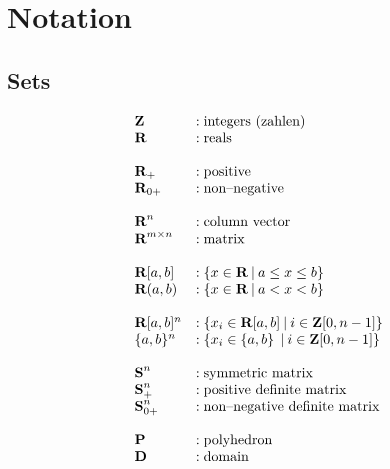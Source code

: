 \documentclass{article}
\title{\QP}
\author {
            Dr. Luke A.~Wendt                                       \\
            Department of Electrical and Computer Engineering       \\
            University of Illinois at Urbana-Champaign              \\
            \texttt{Luke.A.Wendt@gmail.com}                         \\
            \url{Luke-A-Wendt.info}                                 \\
        }
\begin{document}
\maketitle
\begin{abstract}

    This repo explores general formulation 
    of \LP (linear programs)  and \QP (quadratic programs)
    with applications in modeling, prediction, and control.
    These formulations have well-known solution methods that scale and 
    are fully developed technologies integrated into most programming languages
    (making them readily available for embedded applications).
    State-of-the-art implamentation uses hardware accelerated 
    distributed optimization specialized for sparse representations and parallelization.


\end{abstract}
\clearpage
\tableofcontents
\clearpage
\section{Notation}

\subsection{Sets}
\begin{align*}
    \begin{array}{ll}
        \textbf{Z}&:\text{integers (zahlen)}\\
        \textbf{R}&:\text{reals}\\
        \\
        \textbf{R}_+&: \text{positive}\\
        \textbf{R}_{0+}&: \text{non--negative}\\
        \\
        \textbf{R}^n &:\text{column vector}\\
        \textbf{R}^{m\times n} &:\text{matrix}\\
        \\
        \textbf{R}[a,b] &:\{x\in\textbf{R}\:|\:a\leq x\leq b\}\\
        \textbf{R}(a,b) &:\{x\in\textbf{R}\:|\:a<x<b\}\\
        \\
        \textbf{R}[a,b]^n&: \{x_i\in\textbf{R}[a,b]\:|\:i\in\textbf{Z}[0,n-1]\}\\
        \{a,b\}^n&: \{x_i\in\{a,b\}\:\:|\:i\in\textbf{Z}[0,n-1]\}\\
        \\
        \textbf{S}^n&: \text{symmetric matrix}\\
        \textbf{S}_+^n&: \text{positive definite matrix}\\
        \textbf{S}_{0+}^n&: \text{non--negative definite matrix}\\
        \\
        \textbf{P}&:\text{polyhedron}\\
        \textbf{D}&:\text{domain}
    \end{array}
\end{align*}
\end{document}
